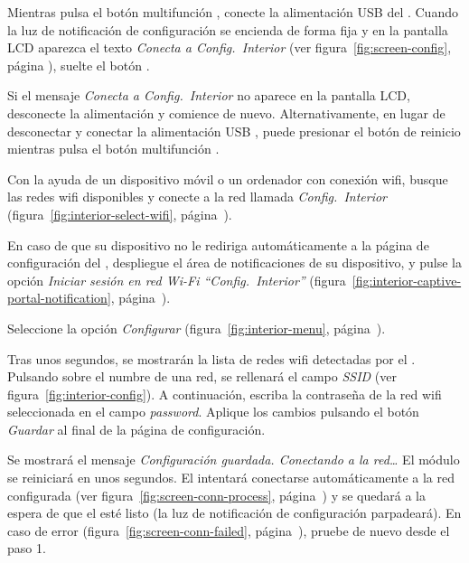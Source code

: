 \begin{enumeratecompact}

\item Mientras pulsa el botón multifunción , conecte la alimentación USB  del \MI. Cuando la luz de notificación de configuración  se encienda de forma fija y en la pantalla LCD  aparezca el texto \emph{Conecta a Config.~Interior} (ver figura~\ref{fig:screen-config}, página \pageref{fig:screen-config}), suelte el botón .

Si el mensaje \emph{Conecta a Config.~Interior} no aparece en la pantalla LCD, desconecte la alimentación y comience de nuevo. Alternativamente, en lugar de desconectar y conectar la alimentación USB , puede presionar el botón de reinicio  mientras pulsa el botón multifunción .

\item Con la ayuda de un dispositivo móvil o un ordenador con conexión wifi, busque las redes wifi disponibles y conecte a la red llamada \emph{Config.~Interior} (figura~\ref{fig:interior-select-wifi}, página~\pageref{fig:interior-select-wifi}).

\item En caso de que su dispositivo no le rediriga automáticamente a la página de configuración del \MI, despliegue el área de notificaciones de su dispositivo, y pulse la opción \emph{Iniciar sesión en red Wi-Fi ``Config.~Interior''} (figura~\ref{fig:interior-captive-portal-notification}, pá\-gi\-na~\pageref{fig:interior-captive-portal-notification}).

\item Seleccione la opción \emph{Configurar} (figura~\ref{fig:interior-menu}, página~\pageref{fig:interior-menu}).

\item Tras unos segundos, se mostrarán la lista de redes wifi detectadas por el \MI. Pulsando sobre el numbre de una red, se rellenará el campo \emph{SSID} (ver figura~\ref{fig:interior-config}). A continuación, escriba la contraseña de la red wifi seleccionada en el campo \emph{password}. Aplique los cambios pulsando el botón \emph{Guardar} al final de la página de configuración.

\item Se mostrará el mensaje \emph{Configuración guardada. Conectando a la red\ldots} El módulo se reiniciará en unos segundos. El \MI intentará conectarse automáticamente a la red configurada (ver figura~\ref{fig:screen-conn-process}, página~\pageref{fig:screen-conn-process}) y se quedará a la espera de que el \MEE esté listo (la luz de notificación de configuración  parpadeará). En caso de error (figura~\ref{fig:screen-conn-failed}, página~\pageref{fig:screen-conn-failed}), pruebe de nuevo desde el paso 1.

\end{enumeratecompact}


